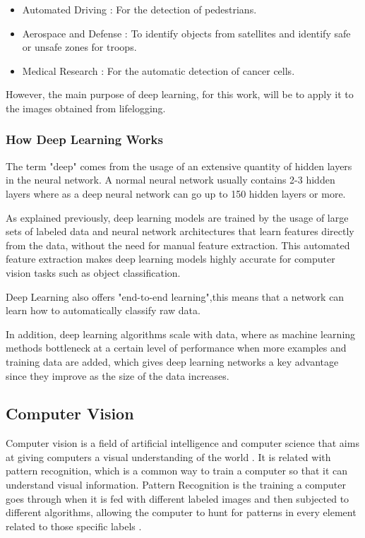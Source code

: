     \begin{itemize}
        \item Automated Driving : For the detection of pedestrians.
        \item Aerospace and Defense : To identify objects from satellites and identify safe or unsafe zones for troops.
        \item Medical Research : For the automatic detection of cancer cells.
    \end{itemize} 

    \par However, the main purpose of deep learning, for this work, will be to apply it to the images obtained from lifelogging.
    
    
    
        \subsubsection{How Deep Learning Works}
        
        \par The term "deep" comes from the usage of an extensive quantity of hidden layers in the neural network. A normal neural network usually contains 2-3 hidden layers where as a deep neural network can go up to 150 hidden layers or more.

        \par As explained previously, deep learning models are trained by the usage of  large sets of labeled data and neural network architectures that learn features directly from the data, without the need for manual feature extraction. This automated feature extraction makes deep learning models highly accurate for computer vision tasks such as object classification. 
        
        \par Deep Learning also offers "end-to-end learning",this means that a network can learn how to automatically classify raw data.

        \par In addition, deep learning algorithms scale with data, where as machine learning methods bottleneck at a certain level of performance when more examples and training data are added, which gives deep learning networks a key advantage since they improve as the size of the data increases. \cite{mathworks_deeplearning}



    \subsection{Computer Vision}
    \par Computer vision is a field of artificial intelligence and computer science that aims at giving computers a visual understanding of the world \cite{cv} \cite{cv2}. It is related with pattern recognition, which is a common way to train a computer so that it can understand visual information. Pattern Recognition is the training a computer goes through when it is fed with different labeled images and then subjected to different algorithms, allowing the computer to hunt for patterns in every element related to those specific labels \cite{pattern}.

